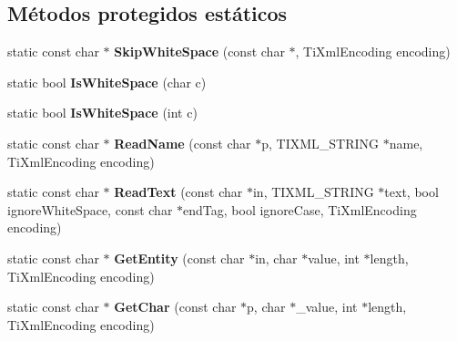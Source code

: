 \subsection*{\-Métodos protegidos estáticos}
\begin{DoxyCompactItemize}
\item 
\hypertarget{classTiXmlBase_ac0c3d66d8a9e6996a1fa016275e16875}{static const char $\ast$ {\bfseries \-Skip\-White\-Space} (const char $\ast$, \-Ti\-Xml\-Encoding encoding)}\label{classTiXmlBase_ac0c3d66d8a9e6996a1fa016275e16875}

\item 
\hypertarget{classTiXmlBase_af56296d561c0bab4bc8e198cdcf5c48e}{static bool {\bfseries \-Is\-White\-Space} (char c)}\label{classTiXmlBase_af56296d561c0bab4bc8e198cdcf5c48e}

\item 
\hypertarget{classTiXmlBase_a3de391ea9f4c4a8aa10d04480b048795}{static bool {\bfseries \-Is\-White\-Space} (int c)}\label{classTiXmlBase_a3de391ea9f4c4a8aa10d04480b048795}

\item 
\hypertarget{classTiXmlBase_a1c21a6ab5f7b503acd91f35f183734b3}{static const char $\ast$ {\bfseries \-Read\-Name} (const char $\ast$p, \-T\-I\-X\-M\-L\-\_\-\-S\-T\-R\-I\-N\-G $\ast$name, \-Ti\-Xml\-Encoding encoding)}\label{classTiXmlBase_a1c21a6ab5f7b503acd91f35f183734b3}

\item 
\hypertarget{classTiXmlBase_aa646c74921aa33156968b802bbf5566e}{static const char $\ast$ {\bfseries \-Read\-Text} (const char $\ast$in, \-T\-I\-X\-M\-L\-\_\-\-S\-T\-R\-I\-N\-G $\ast$text, bool ignore\-White\-Space, const char $\ast$end\-Tag, bool ignore\-Case, \-Ti\-Xml\-Encoding encoding)}\label{classTiXmlBase_aa646c74921aa33156968b802bbf5566e}

\item 
\hypertarget{classTiXmlBase_ac5c08bf3deffcda0bf8ce2958372b584}{static const char $\ast$ {\bfseries \-Get\-Entity} (const char $\ast$in, char $\ast$value, int $\ast$length, \-Ti\-Xml\-Encoding encoding)}\label{classTiXmlBase_ac5c08bf3deffcda0bf8ce2958372b584}

\item 
\hypertarget{classTiXmlBase_a5b0fde72d6f662ae1fd6303195d2159b}{static const char $\ast$ {\bfseries \-Get\-Char} (const char $\ast$p, char $\ast$\-\_\-value, int $\ast$length, \-Ti\-Xml\-Encoding encoding)}\label{classTiXmlBase_a5b0fde72d6f662ae1fd6303195d2159b}


\end{DoxyCompactItemize}
